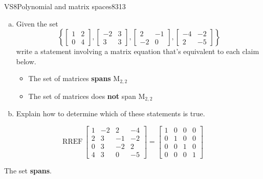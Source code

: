 \begin{exercise}{VS8}{Polynomial and matrix spaces}{8313} 
\begin{exerciseStatement} 

\begin{enumerate}[(a)]
\item  

 Given the set \[\left\{ \left[\begin{array}{cc}
1 & 2 \\
0 & 4
\end{array}\right] , \left[\begin{array}{cc}
-2 & 3 \\
3 & 3
\end{array}\right] , \left[\begin{array}{cc}
2 & -1 \\
-2 & 0
\end{array}\right] , \left[\begin{array}{cc}
-4 & -2 \\
2 & -5
\end{array}\right] \right\}\] write a statement involving a matrix equation that's equivalent to each claim below. 

 

\begin{itemize}
\item  

 The set of matrices \textbf{spans} \(\mathrm{M}_{2,2}\) 

 
\item  

 The set of matrices does \textbf{not} span \(\mathrm{M}_{2,2}\) 

 
\end{itemize}

     
\item  

 Explain how to determine which of these statements is true. 

 
\end{enumerate}

     \end{exerciseStatement}
 \begin{exerciseAnswer} 

 \[
\mathrm{RREF}\, \left[\begin{array}{cccc}
1 & -2 & 2 & -4 \\
2 & 3 & -1 & -2 \\
0 & 3 & -2 & 2 \\
4 & 3 & 0 & -5
\end{array}\right] = \left[\begin{array}{cccc}
1 & 0 & 0 & 0 \\
0 & 1 & 0 & 0 \\
0 & 0 & 1 & 0 \\
0 & 0 & 0 & 1
\end{array}\right]
            \] 

 

 The set \textbf{spans}. 

 \end{exerciseAnswer}
 \end{exercise}


